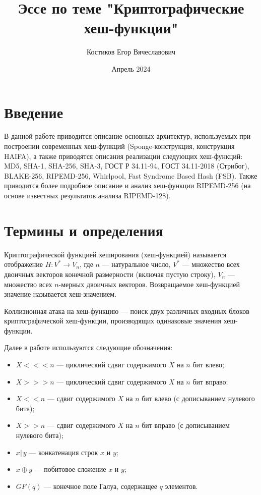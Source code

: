 \documentclass{./civarticle}
\title{Эссе по теме "Криптографические хеш-функции"}
\author{Костиков Егор Вячеславович}
\date{Апрель 2024}
\begin{document}
\maketitle

\section{Введение}

В данной работе приводится описание основных архитектур, используемых при построении современных хеш-функций (Sponge-конструкция, конструкция HAIFA), а также приводятся описания реализации следующих хеш-функций: MD5, SHA-1, SHA-256, SHA-3, ГОСТ Р 34.11-94, ГОСТ 34.11-2018 (Стрибог), BLAKE-256, RIPEMD-256, Whirlpool, Fast Syndrome Based Hash (FSB). Также приводится более подробное описание и анализ хеш-функции RIPEMD-256 (на основе известных результатов анализа RIPEMD-128).

\section{Термины и определения}

Криптографической функцией хеширования (хеш-функцией) называется отображение $H: V^{*} \rightarrow V_n$, где $n$ --- натуральное число, $V^{*}$ --- множество всех двоичных векторов конечной размерности (включая пустую строку), $V_n$ --- множество всех $n$-мерных двоичных векторов. Возвращаемое хеш-функцией значение называется хеш-значением.

Коллизионная атака на хеш-функцию --- поиск двух различных входных блоков криптографической хеш-функции, производящих одинаковые значения хеш-функции.

Далее в работе используются следующие обозначения:
\begin{itemize}
    \item $X <<< n$ --- циклический сдвиг содержимого $X$ на $n$ бит влево;
    \item $X >>> n$ --- циклический сдвиг содержимого $X$ на $n$ бит вправо;
    \item $X << n$ --- сдвиг содержимого $X$ на $n$ бит влево (с дописыванием нулевого бита);
    \item $X >> n$ --- сдвиг содержимого $X$ на $n$ бит вправо (с дописыванием нулевого бита);
    \item $x \mathbin\Vert y$ --- конкатенация строк $x$ и $y$;
    \item $x \oplus y$ --- побитовое сложение $x$ и $y$;
    \item $GF(q)$ --- конечное поле Галуа, содержащее $q$ элементов.
\end{itemize}
\end{document}
